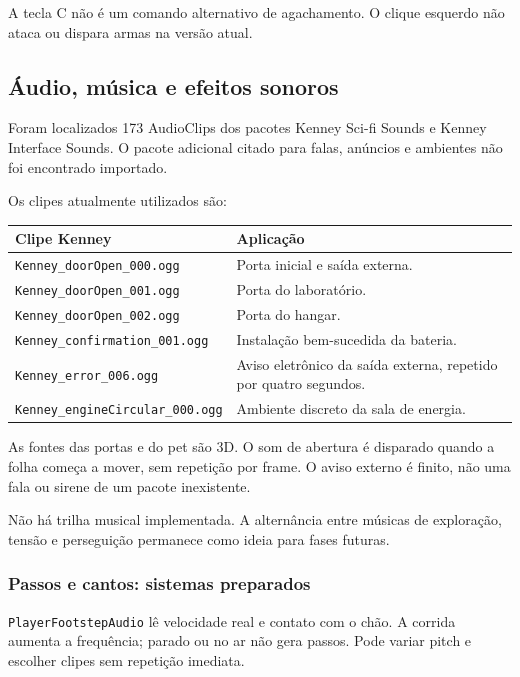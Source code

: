 \documentclass[12pt,a4paper]{article}
\begin{document}
A tecla C não é um comando alternativo de agachamento.
O clique esquerdo não ataca ou dispara armas na versão atual.

\subsection{Áudio, música e efeitos sonoros}

Foram localizados 173 AudioClips dos pacotes Kenney Sci-fi Sounds
e Kenney Interface Sounds. O pacote adicional citado para falas,
anúncios e ambientes não foi encontrado importado.

Os clipes atualmente utilizados são:

\begin{center}
\begin{tabularx}{\textwidth}{|p{6.2cm}|X|}
\hline
\textbf{Clipe Kenney} & \textbf{Aplicação}\\
\hline
\texttt{Kenney\_doorOpen\_000.ogg} & Porta inicial e saída externa.\\
\hline
\texttt{Kenney\_doorOpen\_001.ogg} & Porta do laboratório.\\
\hline
\texttt{Kenney\_doorOpen\_002.ogg} & Porta do hangar.\\
\hline
\texttt{Kenney\_confirmation\_001.ogg} & Instalação bem-sucedida da bateria.\\
\hline
\texttt{Kenney\_error\_006.ogg} & Aviso eletrônico da saída externa, repetido por quatro segundos.\\
\hline
\texttt{Kenney\_engineCircular\_000.ogg} & Ambiente discreto da sala de energia.\\
\hline
\end{tabularx}
\end{center}

As fontes das portas e do pet são 3D. O som de abertura é disparado
quando a folha começa a mover, sem repetição por frame. O aviso
externo é finito, não uma fala ou sirene de um pacote inexistente.

Não há trilha musical implementada. A alternância entre músicas de
exploração, tensão e perseguição permanece como ideia para fases futuras.

\subsubsection*{Passos e cantos: sistemas preparados}

\texttt{PlayerFootstepAudio} lê velocidade real e contato com o chão.
A corrida aumenta a frequência; parado ou no ar não gera passos.
Pode variar pitch e escolher clipes sem repetição imediata.
\end{document}
